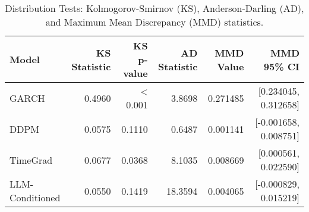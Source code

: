 \begin{table}[htbp]
\centering
\begin{tabular}{lrrrrr}
\toprule
Model & KS Statistic & KS p-value & AD Statistic & MMD Value & MMD 95\% CI \\
\midrule
GARCH & 0.4960 & < 0.001 & 3.8698 & 0.271485 & [0.234045, 0.312658] \\
DDPM & 0.0575 & 0.1110 & 0.6487 & 0.001141 & [-0.001658, 0.008751] \\
TimeGrad & 0.0677 & 0.0368 & 8.1035 & 0.008669 & [0.000561, 0.022590] \\
LLM-Conditioned & 0.0550 & 0.1419 & 18.3594 & 0.004065 & [-0.000829, 0.015219] \\
\bottomrule
\end{tabular}
\caption{Distribution Tests: Kolmogorov-Smirnov (KS), Anderson-Darling (AD), and Maximum Mean Discrepancy (MMD) statistics.}
\label{tab:distribution_tests}
\end{table}
